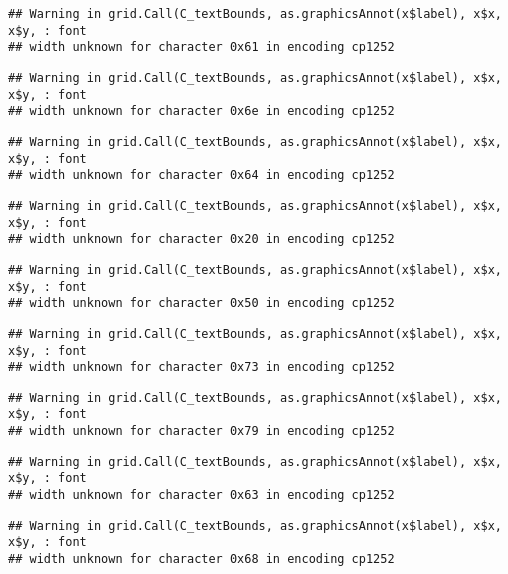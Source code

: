 \documentclass[
]{article}
\begin{document}
\begin{verbatim}
## Warning in grid.Call(C_textBounds, as.graphicsAnnot(x$label), x$x, x$y, : font
## width unknown for character 0x61 in encoding cp1252
\end{verbatim}

\begin{verbatim}
## Warning in grid.Call(C_textBounds, as.graphicsAnnot(x$label), x$x, x$y, : font
## width unknown for character 0x6e in encoding cp1252
\end{verbatim}

\begin{verbatim}
## Warning in grid.Call(C_textBounds, as.graphicsAnnot(x$label), x$x, x$y, : font
## width unknown for character 0x64 in encoding cp1252
\end{verbatim}

\begin{verbatim}
## Warning in grid.Call(C_textBounds, as.graphicsAnnot(x$label), x$x, x$y, : font
## width unknown for character 0x20 in encoding cp1252
\end{verbatim}

\begin{verbatim}
## Warning in grid.Call(C_textBounds, as.graphicsAnnot(x$label), x$x, x$y, : font
## width unknown for character 0x50 in encoding cp1252
\end{verbatim}

\begin{verbatim}
## Warning in grid.Call(C_textBounds, as.graphicsAnnot(x$label), x$x, x$y, : font
## width unknown for character 0x73 in encoding cp1252
\end{verbatim}

\begin{verbatim}
## Warning in grid.Call(C_textBounds, as.graphicsAnnot(x$label), x$x, x$y, : font
## width unknown for character 0x79 in encoding cp1252
\end{verbatim}

\begin{verbatim}
## Warning in grid.Call(C_textBounds, as.graphicsAnnot(x$label), x$x, x$y, : font
## width unknown for character 0x63 in encoding cp1252
\end{verbatim}

\begin{verbatim}
## Warning in grid.Call(C_textBounds, as.graphicsAnnot(x$label), x$x, x$y, : font
## width unknown for character 0x68 in encoding cp1252
\end{verbatim}
\end{document}
